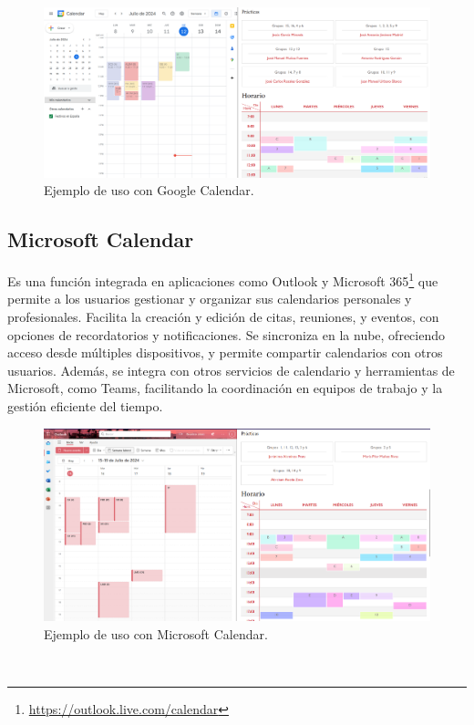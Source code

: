 \begin{figure}[H]
    \centering
    \includegraphics[width=1\textwidth]{./imagenes/Google_Calendar.png}
    \caption{Ejemplo de uso con Google Calendar.}
\end{figure}



\subsection{Microsoft Calendar}
Es una función integrada en aplicaciones como Outlook y Microsoft 365\footnote{\url{https://outlook.live.com/calendar}} que permite a los usuarios gestionar y organizar sus calendarios personales y profesionales. Facilita la creación y edición de citas, reuniones, y eventos, con opciones de recordatorios y notificaciones. Se sincroniza en la nube, ofreciendo acceso desde múltiples dispositivos, y permite compartir calendarios con otros usuarios. Además, se integra con otros servicios de calendario y herramientas de Microsoft, como Teams, facilitando la coordinación en equipos de trabajo y la gestión eficiente del tiempo.




\begin{figure}[H]
    \centering
    \includegraphics[width=1\textwidth]{./imagenes/Microsoft_calendar.png}
    \caption{Ejemplo de uso con Microsoft Calendar.}
\end{figure}
\


